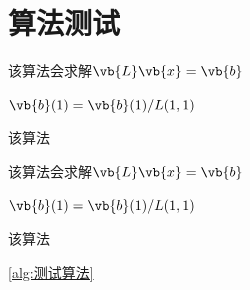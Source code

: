 \chapter{算法测试}

\begin{BoxAlgorithm}[测试算法]
    该算法会求解$\vb{L}\vb{x}=\vb{b}$
    \begin{Algoplain}
        $\vb{b}(1)=\vb{b}(1)/L(1,1)$\;
    \end{Algoplain}

    该算法
\end{BoxAlgorithm}

\begin{BoxProcess}[测试算法]
    该算法会求解$\vb{L}\vb{x}=\vb{b}$
    \begin{Algoplain}
        $\vb{b}(1)=\vb{b}(1)/L(1,1)$\;
    \end{Algoplain}

    该算法
\end{BoxProcess}

\cref{alg:测试算法}
